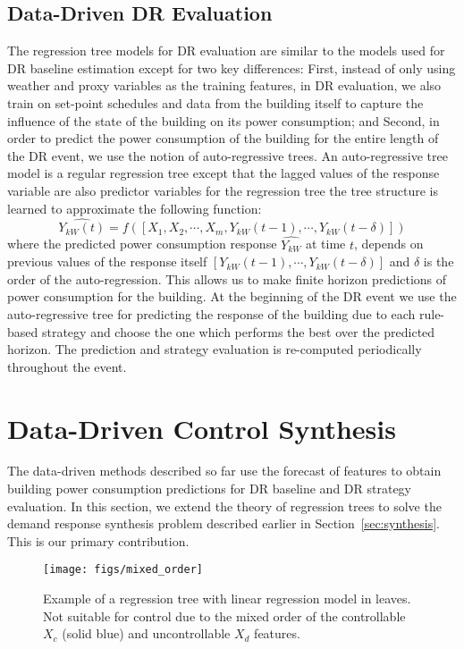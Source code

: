 \documentclass{sig-alternate-ipsn13}
\theoremstyle{definition}
\begin{document}
\subsection{Data-Driven DR Evaluation}
\label{sec:autort}

The regression tree models for DR evaluation are similar to the models used for DR baseline estimation except for two key differences:
First, instead of only using weather and proxy variables as the training features, in DR evaluation, we also train on set-point schedules and data from the building itself to capture the influence of the state of the building on its power consumption; and 
Second, in order to predict the power consumption of the building for the entire length of the DR event, we use the notion of auto-regressive trees. An auto-regressive tree model is a regular regression tree except that the lagged values of the response variable are also predictor variables for the regression tree \ie the tree structure is learned to approximate the following function:
\begin{equation}
\hat{Y_{kW}(t)} = f([X_1, X_2,\cdots, X_m,Y_{kW}(t-1),\cdots,Y_{kW}(t-\delta)])
\end{equation}
where the predicted power consumption response $\hat{Y_{kW}}$ at time $t$, depends on previous values of the response itself $[Y_{kW}(t-1),\cdots,Y_{kW}(t-\delta)]$ and $\delta$ is the order of the auto-regression.
This allows us to make finite horizon predictions of power consumption for the building.
At the beginning of the DR event we use the auto-regressive tree for predicting the response of the building due to each rule-based strategy and choose the one which performs the best over the predicted horizon. The prediction and strategy evaluation is re-computed periodically throughout the event.

\section{Data-Driven Control Synthesis}
\label{sec:drsyn}
The data-driven methods described so far use the forecast of features to obtain building power consumption predictions  for DR baseline and DR strategy evaluation.
In this section, we extend the theory of regression trees to solve the demand response synthesis problem described earlier in Section~\ref{sec:synthesis}. This is our primary contribution. 
  \begin{figure}
  \centering
  \texttt{[image: figs/mixed\_order]}
  \caption{Example of a regression tree with linear regression model in leaves. Not suitable for control due to the mixed order of the controllable $X_c$ (solid blue) and uncontrollable $X_d$ features.}
  \label{fig:mixed_order}
  \vspace{-10pt}
\end{figure}
\end{document}
